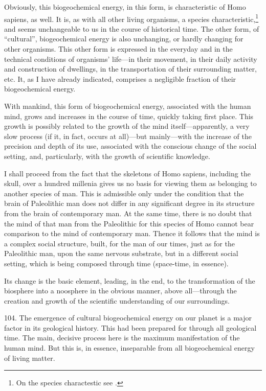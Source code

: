 Obviously, this biogeochemical energy, in this form, is characteristic of Homo
sapiens, as well.  It is, as with all other living organisms, a species
characteristic,\footnote{
	On the species charactestic see \cite{vernadsky1930considerations}.
} and seems unchangeable to us in the course of historical time.  The other
form, of ``cultural'', biogeochemical energy is also unchanging, or hardly
changing for other organisms.  This other form is expressed in the everyday and
in the technical conditions of organisms' life---in their movement, in their
daily activity and construction of dwellings, in the transportation of their
surrounding matter, etc.  It, as I have already indicated, comprises a
negligible fraction of their biogeochemical energy.

With mankind, this form of biogeochemical energy, associated with the human
mind, grows and increases in the course of time, quickly taking first place.
This growth is possibly related to the growth of the mind itself---apparently,
a very slow process (if it, in fact, occurs at all)---but mainly---with the
increase of the precision and depth of its use, associated with the conscious
change of the social setting, and, particularly, with the growth of scientific
knowledge.

I shall proceed from the fact that the skeletons of Homo sapiens, including
the skull, over a hundred millenia gives us no basis for viewing them as
belonging to another species of man.  This is admissible only under the
condition that the brain of Paleolithic man does not differ in any significant
degree in its structure from the brain of contemporary man.  At the same time,
there is no doubt that the mind of that man from the Paleolithic for this
species of Homo cannot bear comparison to the mind of contemporary man.
Thence it follows that the mind is a complex social structure, built, for the
man of our times, just as for the Paleolithic man, upon the same nervous
substrate, but in a different social setting, which is being composed through
time (space-time, in essence).

Its change is the basic element, leading, in the end, to the transformation of
the biosphere into a noosphere in the obvious manner, above all---through the
creation and growth of the scientific understanding of our surroundings.


104. The emergence of cultural biogeochemical energy on our planet is a major
factor in its geological history.  This had been prepared for through all
geological time.  The main, decisive process here is the maximum manifestation
of the human mind.  But this is, in essence, inseparable from all
biogeochemical energy of living matter.

